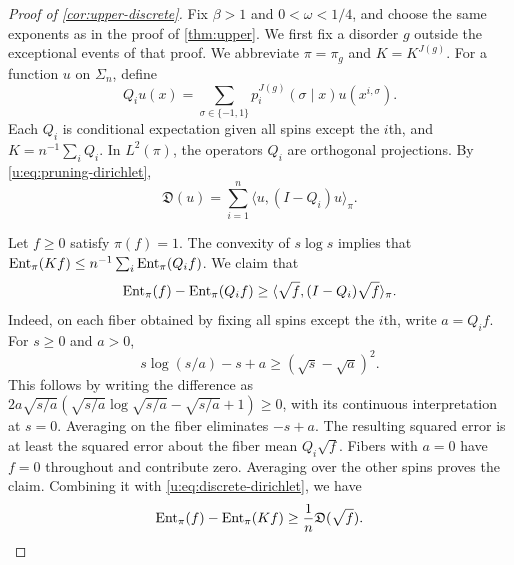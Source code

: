 \begin{proof}[Proof of \cref{cor:upper-discrete}]
Fix $\beta>1$ and $0<\omega<1/4$, and choose the same exponents as
in the proof of \cref{thm:upper}. We first fix a disorder $g$
outside the exceptional events of that proof. We abbreviate
$\pi=\pi_g$ and $K=K^{J(g)}$. For a function $u$ on $\Sigma_n$, define
\[
 Q_i u(x)=\sum_{\sigma\in\{-1,1\}}
                  p_i^{J(g)}(\sigma\mid x)u(x^{i,\sigma}).
\]
Each $Q_i$ is conditional expectation given all spins except the
$i$th, and $K=n^{-1}\sum_iQ_i$. In $L^2(\pi)$, the operators $Q_i$
are orthogonal projections. By \eqref{u:eq:pruning-dirichlet},
\begin{equation}\label{u:eq:discrete-dirichlet}
 \mathfrak D(u)=\sum_{i=1}^n\langle u,(I-Q_i)u\rangle_\pi.
\end{equation}

Let $f\ge0$ satisfy $\pi(f)=1$. The convexity of $s\log s$ implies that
$\operatorname{Ent}_\pi(Kf)\le n^{-1}\sum_i\operatorname{Ent}_\pi(Q_i f)$.
We claim that
\[
 \operatorname{Ent}_\pi(f)-\operatorname{Ent}_\pi(Q_i f)
 \ge\langle\sqrt f,(I-Q_i)\sqrt f\rangle_\pi.
\]
Indeed, on each fiber obtained by fixing all spins except the $i$th,
write $a=Q_i f$. For $s\ge0$ and $a>0$,
\[
 s\log(s/a)-s+a\ge(\sqrt s-\sqrt a)^2.
\]
This follows by writing the difference as
$2a\sqrt{s/a}(\sqrt{s/a}\log\sqrt{s/a}-\sqrt{s/a}+1)\ge0$,
with its continuous interpretation at $s=0$. Averaging on the fiber
eliminates $-s+a$. The resulting squared error is at least the squared
error about the fiber mean $Q_i\sqrt f$. Fibers with $a=0$ have $f=0$
throughout and contribute zero. Averaging over the other spins proves
the claim. Combining it with \eqref{u:eq:discrete-dirichlet}, we have
\begin{equation}\label{u:eq:discrete-entropy-step}
 \operatorname{Ent}_\pi(f)-\operatorname{Ent}_\pi(Kf)
 \ge\frac1n\mathfrak D(\sqrt f).
\end{equation}


\end{proof}
